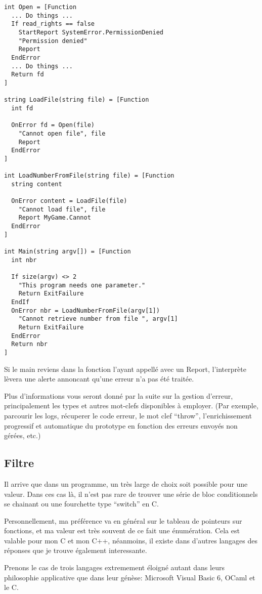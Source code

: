 \documentclass[a5paper, 12pt]{book}
\begin{document}
\begin{verbatim}
int Open = [Function
  ... Do things ...
  If read_rights == false
    StartReport SystemError.PermissionDenied
    "Permission denied"
    Report
  EndError
  ... Do things ...
  Return fd
]

string LoadFile(string file) = [Function
  int fd

  OnError fd = Open(file)
    "Cannot open file", file
    Report 
  EndError
]

int LoadNumberFromFile(string file) = [Function
  string content

  OnError content = LoadFile(file)
    "Cannot load file", file
    Report MyGame.Cannot
  EndError
]

int Main(string argv[]) = [Function
  int nbr

  If size(argv) <> 2
    "This program needs one parameter."
    Return ExitFailure
  EndIf
  OnError nbr = LoadNumberFromFile(argv[1])
    "Cannot retrieve number from file ", argv[1]
    Return ExitFailure
  EndError
  Return nbr    
]
\end{verbatim}

Si le main reviens dans la fonction l'ayant appellé avec un Report,
l'interprète lèvera une alerte annoncant qu'une erreur n'a pas
été traitée.

Plus d'informations vous seront donné par la suite sur
la gestion d'erreur, principalement les types et autres
mot-clefs disponibles à employer. (Par exemple, parcourir
les logs, récuperer le code erreur, le mot clef ``throw'',
l'enrichissement progressif et automatique du prototype
en fonction des erreurs envoyés non gérées, etc.)

\subsection{Filtre}

Il arrive que dans un programme, un très large de choix
soit possible pour une valeur. Dans ces cas là, il n'est
pas rare de trouver une série de bloc conditionnels se
chainant ou une fourchette type ``switch'' en C.

Personnellement, ma préférence va en général sur le
tableau de pointeurs sur fonctions, et ma valeur est
très souvent de ce fait une énumération. Cela est valable
pour mon C et mon C++, néanmoins, il existe dans d'autres
langages des réponses que je trouve également interessante.

Prenons le cas de trois langages extremement éloigné autant
dans leurs philosophie applicative que dans leur génèse:
Microsoft Visual Basic 6, OCaml et le C.
\end{document}
